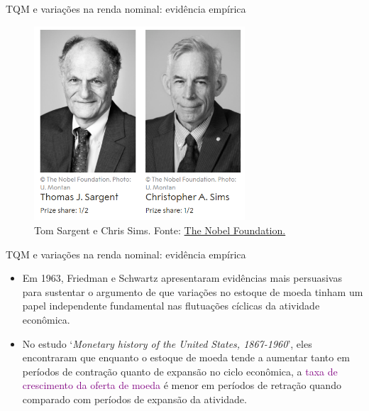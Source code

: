 \documentclass[10pt]{beamer}
\begin{document}
\begin{frame}{TQM e variações na renda nominal: evidência empírica}
    \begin{figure}
        \centering
        \includegraphics[width=0.7\textwidth]{./figures/aula10_fig4.PNG}
        \caption{Tom Sargent e Chris Sims. Fonte: \href{https://www.nobelprize.org/prizes/economic-sciences/2011/summary/}{The Nobel Foundation.}}
        \label{fig4}
    \end{figure}
\end{frame}

\begin{frame}{TQM e variações na renda nominal: evidência empírica}
    \begin{itemize}
        \item Em 1963, Friedman e Schwartz apresentaram evidências mais persuasivas para sustentar o argumento de que variações no estoque de moeda tinham um papel independente fundamental nas flutuações cíclicas da atividade econômica.
        \bigskip
        \item No estudo `\emph{Monetary history of the United States, 1867-1960}', eles encontraram que enquanto o estoque de moeda tende a aumentar tanto em períodos de contração quanto de expansão no ciclo econômica, a \textcolor{purple}{taxa de crescimento da oferta de moeda} é menor em períodos de retração quando comparado com períodos de expansão da atividade.
    \end{itemize}
\end{frame}
\end{document}
